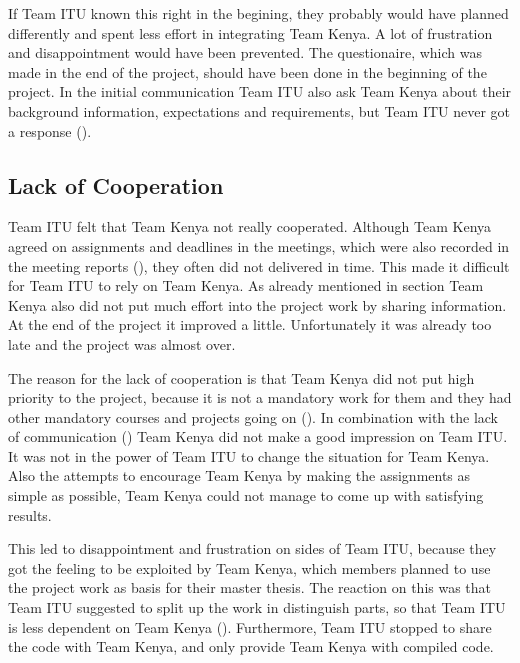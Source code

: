 If Team ITU known this right in the begining, they probably would have planned differently and spent less effort in integrating Team Kenya. A lot of frustration and disappointment would have been prevented. The questionaire, which was made in the end of the project, should have been done in the beginning of the project. In the initial communication Team ITU also ask Team Kenya about their background information, expectations and requirements, but Team ITU never got a response ().


\subsection{Lack of Cooperation}
Team ITU felt that Team Kenya not really cooperated. Although Team Kenya agreed on assignments and deadlines in the meetings, which were also recorded in the meeting reports (), they often did not delivered in time. This made it difficult for Team ITU to rely on Team Kenya. As already mentioned in section  Team Kenya also did not put much effort into the project work by sharing information. At the end of the project it improved a little. Unfortunately it was already too late and the project was almost over.

The reason for the lack of cooperation is that Team Kenya did not put high priority to the project, because it is not a mandatory work for them and they had other mandatory courses and projects going on (). In combination with the lack of communication () Team Kenya did not make a good impression on Team ITU. It was not in the power of Team ITU to change the situation for Team Kenya. Also the attempts to encourage Team Kenya by making the assignments as simple as possible, Team Kenya could not manage to come up with satisfying results.

This led to disappointment and frustration on sides of Team ITU, because they got the feeling to be exploited by Team Kenya, which members planned to use the project work as basis for their master thesis. The reaction on this was that Team ITU suggested to split up the work in distinguish parts, so that Team ITU is less dependent on Team Kenya (). Furthermore, Team ITU stopped to share the code with Team Kenya, and only provide Team Kenya with compiled code.

